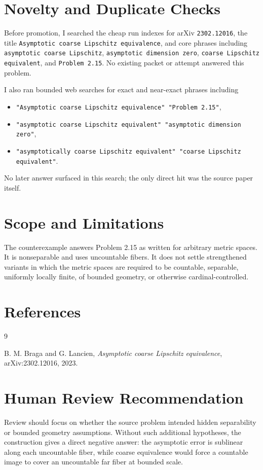 \documentclass[11pt]{article}
\begin{document}
\section*{Novelty and Duplicate Checks}

Before promotion, I searched the cheap run indexes for arXiv \texttt{2302.12016}, the title
\texttt{Asymptotic coarse Lipschitz equivalence}, and core phrases including
\texttt{asymptotic coarse Lipschitz}, \texttt{asymptotic dimension zero},
\texttt{coarse Lipschitz equivalent}, and \texttt{Problem 2.15}.  No existing packet or
attempt answered this problem.

I also ran bounded web searches for exact and near-exact phrases including
\begin{itemize}
\item \texttt{"Asymptotic coarse Lipschitz equivalence" "Problem 2.15"},
\item \texttt{"asymptotic coarse Lipschitz equivalent" "asymptotic dimension zero"},
\item \texttt{"asymptotically coarse Lipschitz equivalent" "coarse Lipschitz equivalent"}.
\end{itemize}
No later answer surfaced in this search; the only direct hit was the source paper itself.

\section*{Scope and Limitations}

The counterexample answers Problem 2.15 as written for arbitrary metric spaces.  It is
nonseparable and uses uncountable fibers.  It does not settle strengthened variants in which
the metric spaces are required to be countable, separable, uniformly locally finite, of
bounded geometry, or otherwise cardinal-controlled.

\section*{References}

\begin{thebibliography}{9}

B. M. Braga and G. Lancien,
\emph{Asymptotic coarse Lipschitz equivalence},
arXiv:2302.12016, 2023.

\end{thebibliography}

\section*{Human Review Recommendation}

Review should focus on whether the source problem intended hidden separability or bounded
geometry assumptions.  Without such additional hypotheses, the construction gives a direct
negative answer: the asymptotic error is sublinear along each uncountable fiber, while coarse
equivalence would force a countable image to cover an uncountable far fiber at bounded scale.
\end{document}
